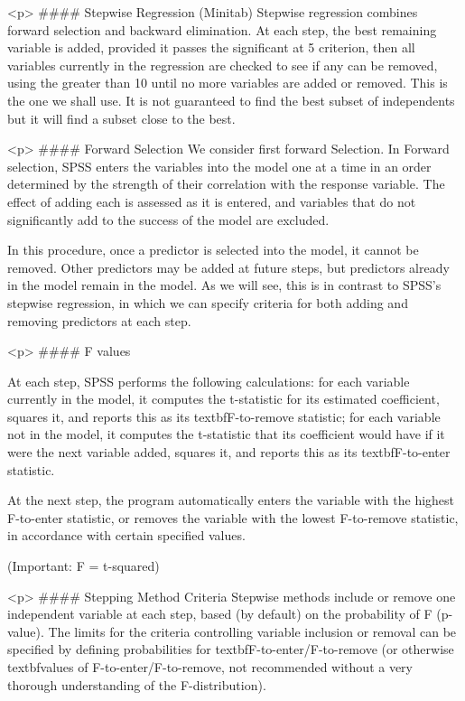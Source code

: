 <p>
#### {Stepwise Regression (Minitab)}
Stepwise regression combines forward selection and backward elimination. At each
step, the best remaining variable is added, provided it passes the significant at 5%
criterion, then all variables currently in the regression are checked to see if any can be
removed, using the greater than 10%
until no more variables are added or removed. This is the one we shall use. It is not
guaranteed to find the best subset of independents but it will find a subset close to the
best.


<p>
#### {Forward Selection}
We consider first forward Selection. In Forward selection, SPSS enters the variables into the model one at a time in an
order determined by the strength of their correlation with the response variable. The effect of adding each is assessed as it is entered, and variables that do not significantly add to the success of the model are excluded.

In this procedure, once a predictor is selected into the model, it cannot be removed. Other predictors may be added at future steps, but predictors already in the model remain in the model. As we will see, this is in contrast to SPSS's stepwise regression, in which we can specify criteria for both adding and removing predictors at each step.






<p>
#### {F values}

At each step, SPSS performs the following calculations: for each variable currently in the model, it computes the t-statistic for its estimated coefficient, squares it, and reports this as its textbf{F-to-remove} statistic; for each variable not in the model, it computes the t-statistic that its coefficient would have if it were the next variable added, squares it, and reports this as its textbf{F-to-enter} statistic.

At the next step, the program automatically enters the variable with the highest F-to-enter statistic, or removes the variable with the lowest F-to-remove statistic, in accordance with certain specified values. 

(Important: F = t-squared)

<p>
#### {Stepping Method Criteria}
Stepwise methods include or remove one independent variable at each step, based (by default) on the probability of F (p-value). The limits for the criteria controlling variable inclusion or removal can be specified by defining probabilities for textbf{F-to-enter/F-to-remove} (or otherwise textbf{values of F-to-enter/F-to-remove}, not recommended without a very thorough understanding of the F-distribution).




